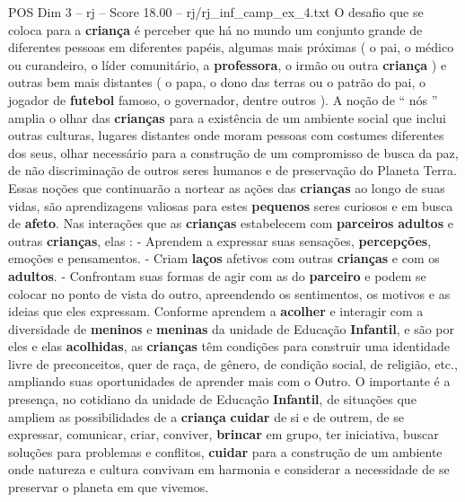 \begin{textsample}{POS Dim 3 – rj – Score 18.00 – rj/rj\_inf\_camp\_ex\_4.txt}
O desafio que se coloca para a \textbf{criança} é perceber que há no mundo um conjunto grande de diferentes pessoas em diferentes papéis, algumas mais próximas ( o pai, o médico ou curandeiro, o líder comunitário, a \textbf{professora}, o irmão ou outra \textbf{criança} ) e outras bem mais distantes ( o papa, o dono das terras ou o patrão do pai, o jogador de \textbf{futebol} famoso, o governador, dentre outros ).
A noção de “ nós ” amplia o olhar das \textbf{crianças} para a existência de um ambiente social que inclui outras culturas, lugares distantes onde moram pessoas com costumes diferentes dos seus, olhar necessário para a construção de um compromisso de busca da paz, de não discriminação de outros seres humanos e de preservação do Planeta Terra.
Essas noções que continuarão a nortear as ações das \textbf{crianças} ao longo de suas vidas, são aprendizagens valiosas para estes \textbf{pequenos} seres curiosos e em busca de \textbf{afeto}.
Nas interações que as \textbf{crianças} estabelecem com \textbf{parceiros} \textbf{adultos} e outras \textbf{crianças}, elas : - Aprendem a expressar suas sensações, \textbf{percepções}, emoções e pensamentos. - Criam \textbf{laços} afetivos com outras \textbf{crianças} e com os \textbf{adultos}. - Confrontam suas formas de agir com as do \textbf{parceiro} e podem se colocar no ponto de vista do outro, apreendendo os sentimentos, os motivos e as ideias que eles expressam.
Conforme aprendem a \textbf{acolher} e interagir com a diversidade de \textbf{meninos} e \textbf{meninas} da unidade de Educação \textbf{Infantil}, e são por eles e elas \textbf{acolhidas}, as \textbf{crianças} têm condições para construir uma identidade livre de preconceitos, quer de raça, de gênero, de condição social, de religião, etc., ampliando suas oportunidades de aprender mais com o Outro.
O importante é a presença, no cotidiano da unidade de Educação \textbf{Infantil}, de situações que ampliem as possibilidades de a \textbf{criança} \textbf{cuidar} de si e de outrem, de se expressar, comunicar, criar, conviver, \textbf{brincar} em grupo, ter iniciativa, buscar soluções para problemas e conflitos, \textbf{cuidar} para a construção de um ambiente onde natureza e cultura convivam em harmonia e considerar a necessidade de se preservar o planeta em que vivemos.

\end{textsample}
